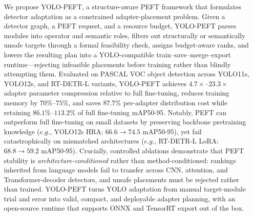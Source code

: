 {We propose YOLO-PEFT, a structure-aware PEFT framework that formulates detector adaptation as a constrained adapter-placement problem. Given a detector graph, a PEFT request, and a resource budget, YOLO-PEFT parses modules into operator and semantic roles, filters out structurally or semantically unsafe targets through a formal feasibility check, assigns budget-aware ranks, and lowers the resulting plan into a YOLO-compatible train--save--merge--export runtime---rejecting infeasible placements before training rather than blindly attempting them. Evaluated on PASCAL VOC object detection across YOLO11s, YOLO12s, and RT-DETR-L variants, YOLO-PEFT achieves $4.7\times$--$23.3\times$ adapter parameter compression relative to full fine-tuning, reduces training memory by $70\%$--$75\%$, and saves $87.7\%$ per-adapter distribution cost while retaining $86.1\%$--$113.2\%$ of full fine-tuning mAP50-95. Notably, PEFT can outperform full fine-tuning on small datasets by preserving backbone pretraining  knowledge ($e.g.$, YOLO12s HRA: $66.6\rightarrow74.5$ mAP50-95), yet fail catastrophically on mismatched architectures ($e.g.$, RT-DETR-L LoRA: $68.8\rightarrow59.2$ mAP50-95). Crucially, controlled ablations demonstrate that PEFT stability is \emph{architecture-conditioned} rather than method-conditioned: rankings inherited from language models fail to transfer across CNN, attention, and Transformer-decoder detectors, and unsafe placements must be rejected rather than trained. YOLO-PEFT turns YOLO adaptation from manual target-module trial and error into valid, compact, and deployable adapter planning, with an open-source runtime that supports ONNX and TensorRT export out of the box.


}
